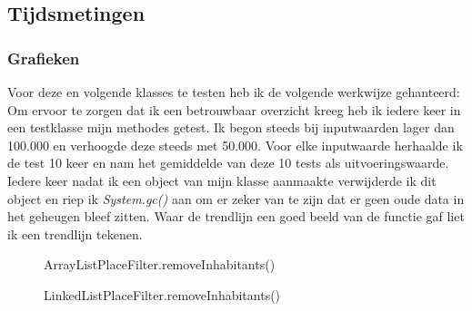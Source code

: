 \documentclass[10pt,a4paper]{report}
\begin{document}
\subsection*{Tijdsmetingen}
\subsubsection*{Grafieken}
Voor deze en volgende klasses te testen heb ik de volgende werkwijze gehanteerd:\\
Om ervoor te zorgen dat ik een betrouwbaar overzicht kreeg heb ik iedere keer in een testklasse mijn methodes getest. Ik begon steeds bij inputwaarden lager dan 100.000 en verhoogde deze steeds met 50.000. Voor elke inputwaarde herhaalde ik de test 10 keer en nam het gemiddelde van deze 10 tests als uitvoeringswaarde. Iedere keer nadat ik een object van mijn klasse aanmaakte verwijderde ik dit object en riep ik \textsl{System.gc()} aan om er zeker van te zijn dat er geen oude data in het geheugen bleef zitten. Waar de trendlijn een goed beeld van de functie gaf liet ik een trendlijn tekenen.
\begin{figure}[h!]
    \centering
    \caption{ArrayListPlaceFilter.removeInhabitants()}
    \label{fig:ALPC-rI}
\end{figure}
\begin{figure}[h!]
    \centering
    \caption{LinkedListPlaceFilter.removeInhabitants()}
    \label{fig:LLPC-rI}
\end{figure}
\newpage
\end{document}
